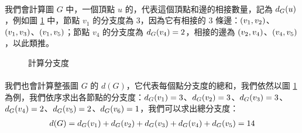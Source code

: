 \documentclass[12pt,a4paper,oneside]{report}
\begin{document}
\begin{CJK}{UTF8}{bkai}
\paragraph{}我們會計算圖 $G$ 中，一個頂點 $u$ 的\textbf{}，代表這個頂點和邊的相接數量，記為 $d_{G}{(u)}$，例如圖 \ref{fig:degree_cal} 中，節點 $v_1$ 的分支度為 3，因為它有相接的 3 條邊：$({v_1},{v_2})$、$({v_1},{v_3})$、$({v_1},{v_5})$；節點 $v_4$ 的分支度為 $d_{G}{(v_4)}=2$，相接的邊為 $({v_2},{v_4})$、$({v_4},{v_5})$，以此類推。
\begin{figure}[h!]
\centering
{}
\caption{計算分支度}
\label{fig:degree_cal}
\end{figure}

\paragraph{}我們也會計算整張圖 $G$ 的\textbf{} $d(G)$，它代表每個點分支度的總和，我們依然以圖 \ref{fig:degree_cal} 為例，我們依序求出各節點的分支度：$d_{G}{(v_1)}=3$、$d_{G}{(v_2)}=3$、$d_{G}{(v_3)}=3$、$d_{G}{(v_4)}=2$、$d_{G}{(v_5)}=2$、$d_{G}{(v_6)}=1$，我們可以求出總分支度：
\begin{align*}
d(G)=d_{G}{(v_1)}+d_{G}{(v_2)}+d_{G}{(v_3)}+d_{G}{(v_4)}+d_{G}{(v_5)}=14
\end{align*}

\end{CJK}
\end{document}
